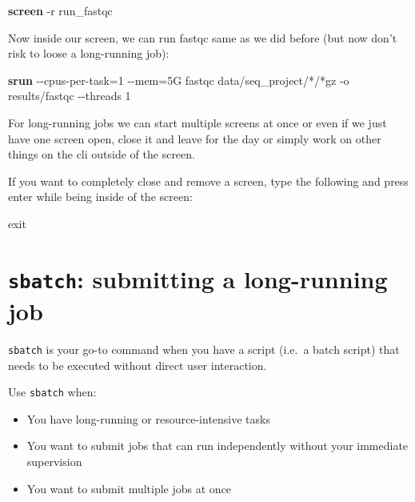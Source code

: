 \documentclass[
  letterpaper,
  DIV=11,
  numbers=noendperiod]{scrreprt}
\newenvironment{Shaded}{}{}
\newcommand{\AttributeTok}[1]{\textcolor[rgb]{0.84,0.23,0.29}{#1}}
\newcommand{\BuiltInTok}[1]{\textcolor[rgb]{0.84,0.23,0.29}{#1}}
\newcommand{\ExtensionTok}[1]{\textcolor[rgb]{0.84,0.23,0.29}{\textbf{#1}}}
\newcommand{\NormalTok}[1]{\textcolor[rgb]{0.14,0.16,0.18}{#1}}
\newcommand{\OperatorTok}[1]{\textcolor[rgb]{0.14,0.16,0.18}{#1}}
\newcommand{\PreprocessorTok}[1]{\textcolor[rgb]{0.84,0.23,0.29}{#1}}
\providecommand{\tightlist}{%
  \setlength{\itemsep}{0pt}\setlength{\parskip}{0pt}}\usepackage{longtable,booktabs,array}
\begin{document}
\begin{Shaded}
\begin{Highlighting}[]
\ExtensionTok{screen} \AttributeTok{{-}r}\NormalTok{ run\_fastqc}
\end{Highlighting}
\end{Shaded}

Now inside our screen, we can run fastqc same as we did before (but now
don't risk to loose a long-running job):

\begin{Shaded}
\begin{Highlighting}[]
\ExtensionTok{srun} \AttributeTok{{-}{-}cpus{-}per{-}task}\OperatorTok{=}\NormalTok{1 }\AttributeTok{{-}{-}mem}\OperatorTok{=}\NormalTok{5G fastqc data/seq\_project/}\PreprocessorTok{*}\NormalTok{/}\PreprocessorTok{*}\NormalTok{gz }\AttributeTok{{-}o}\NormalTok{ results/fastqc  }\AttributeTok{{-}{-}threads}\NormalTok{ 1 }
\end{Highlighting}
\end{Shaded}

For long-running jobs we can start multiple screens at once or even if
we just have one screen open, close it and leave for the day or simply
work on other things on the cli outside of the screen.

If you want to completely close and remove a screen, type the following
and press enter while being inside of the screen:

\begin{Shaded}
\begin{Highlighting}[]
\BuiltInTok{exit}
\end{Highlighting}
\end{Shaded}

\section{\texorpdfstring{\texttt{sbatch}: submitting a long-running
job}{sbatch: submitting a long-running job}}\label{sbatch-submitting-a-long-running-job}

\texttt{sbatch} is your go-to command when you have a script (i.e.~a
batch script) that needs to be executed without direct user interaction.

Use \texttt{sbatch} when:

\begin{itemize}
\tightlist
\item
  You have long-running or resource-intensive tasks
\item
  You want to submit jobs that can run independently without your
  immediate supervision
\item
  You want to submit multiple jobs at once
\end{itemize}
\end{document}
